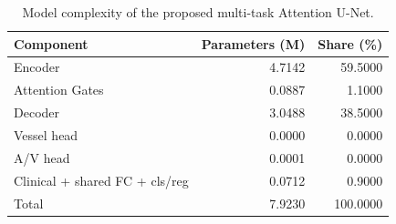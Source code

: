 \begin{table}
\caption{Model complexity of the proposed multi-task Attention U-Net.}
\label{tab:model_complexity}
\begin{tabular}{lrr}
\toprule
Component & Parameters (M) & Share (\%) \\
\midrule
Encoder & 4.7142 & 59.5000 \\
Attention Gates & 0.0887 & 1.1000 \\
Decoder & 3.0488 & 38.5000 \\
Vessel head & 0.0000 & 0.0000 \\
A/V head & 0.0001 & 0.0000 \\
Clinical + shared FC + cls/reg & 0.0712 & 0.9000 \\
Total & 7.9230 & 100.0000 \\
\bottomrule
\end{tabular}
\end{table}

